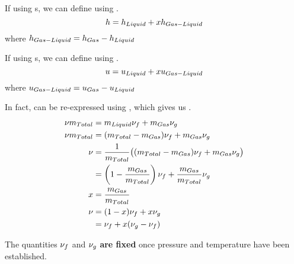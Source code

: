 If using s, we can define  using .
\begin{equation}\label{eq:Mixture_Specific_Enthalpy}
  h = h_{Liquid} + x h_{Gas-Liquid}
\end{equation}
where $h_{Gas-Liquid} = h_{Gas} - h_{Liquid}$

If using s, we can define  using .
\begin{equation}\label{eq:Mixture_Internal_Energy}
  u = u_{Liquid} + x u_{Gas-Liquid}
\end{equation}
where $u_{Gas-Liquid} = u_{Gas} - u_{Liquid}$

In fact,  can be re-expressed using , which gives us .
\begin{align*}
  \nu m_{Total} &= m_{Liquid} \nu_{f} + m_{Gas} \nu_{g} \\
  \nu m_{Total} &= (m_{Total} - m_{Gas}) \nu_{f} + m_{Gas} \nu_{g} \\
  \nu &= \frac{1}{m_{Total}} \bigl( (m_{Total} - m_{Gas}) \nu_{f} + m_{Gas} \nu_{g} \bigr) \\
                                &= \left( 1 - \frac{m_{Gas}}{m_{Total}} \right) \nu_{f} + \frac{m_{Gas}}{m_{Total}} \nu_{g} \\
  x &= \frac{m_{Gas}}{m_{Total}} \\
  \nu &= (1 - x) \nu_{f} + x \nu_{g} \\
  &= \nu_{f} + x (\nu_{g} - \nu_{f})
\end{align*}

The quantities $\nu_{f}$ and $\nu_{g}$ \textbf{are fixed} once pressure and temperature have been established.

